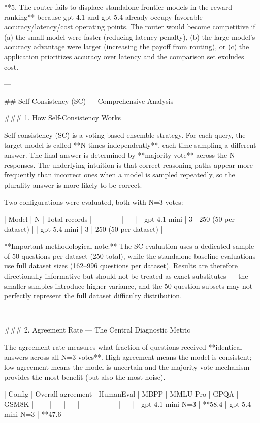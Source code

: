**5. The router fails to displace standalone frontier models in the reward ranking** because gpt-4.1 and gpt-5.4 already occupy favorable accuracy/latency/cost operating points. The router would become competitive if (a) the small model were faster (reducing latency penalty), (b) the large model's accuracy advantage were larger (increasing the payoff from routing), or (c) the application prioritizes accuracy over latency and the comparison set excludes cost.

---

## Self-Consistency (SC) — Comprehensive Analysis

### 1. How Self-Consistency Works

Self-consistency (SC) is a voting-based ensemble strategy. For each query, the target model is called **N times independently**, each time sampling a different answer. The final answer is determined by **majority vote** across the N responses. The underlying intuition is that correct reasoning paths appear more frequently than incorrect ones when a model is sampled repeatedly, so the plurality answer is more likely to be correct.

Two configurations were evaluated, both with N=3 votes:

| Model | N | Total records |
| --- | --- | --- |
| gpt-4.1-mini | 3 | 250 (50 per dataset) |
| gpt-5.4-mini | 3 | 250 (50 per dataset) |

**Important methodological note:** The SC evaluation uses a dedicated sample of 50 questions per dataset (250 total), while the standalone baseline evaluations use full dataset sizes (162–996 questions per dataset). Results are therefore directionally informative but should not be treated as exact substitutes — the smaller samples introduce higher variance, and the 50-question subsets may not perfectly represent the full dataset difficulty distribution.

---

### 2. Agreement Rate — The Central Diagnostic Metric

The agreement rate measures what fraction of questions received **identical answers across all N=3 votes**. High agreement means the model is consistent; low agreement means the model is uncertain and the majority-vote mechanism provides the most benefit (but also the most noise).

| Config | Overall agreement | HumanEval | MBPP | MMLU-Pro | GPQA | GSM8K |
| --- | --- | --- | --- | --- | --- | --- |
| gpt-4.1-mini N=3 | **58.4%
| gpt-5.4-mini N=3 | **47.6%

